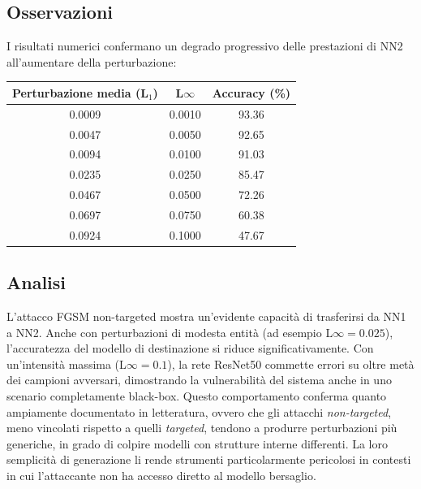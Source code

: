         \subsection{Osservazioni}
            I risultati numerici confermano un degrado progressivo delle prestazioni di NN2 all’aumentare della perturbazione:
                \begin{center}
                    \begin{tabular}{ccc}
                        \toprule
                        \textbf{Perturbazione media (L$_1$)} & \textbf{L$\infty$} & \textbf{Accuracy (\%)} \\
                        \midrule
                        0.0009 & 0.0010 & 93.36 \\
                        0.0047 & 0.0050 & 92.65 \\
                        0.0094 & 0.0100 & 91.03 \\
                        0.0235 & 0.0250 & 85.47 \\
                        0.0467 & 0.0500 & 72.26 \\
                        0.0697 & 0.0750 & 60.38 \\
                        0.0924 & 0.1000 & 47.67 \\
                        \bottomrule
                    \end{tabular}
                \end{center}

        \subsection{Analisi}
            L'attacco FGSM non-targeted mostra un'evidente capacità di trasferirsi da NN1 a NN2. Anche con perturbazioni di modesta entità (ad esempio L$\infty=0.025$), l'accuratezza del modello di destinazione si riduce significativamente. Con un'intensità massima (L$\infty=0.1$), la rete ResNet50 commette errori su oltre metà dei campioni avversari, dimostrando la vulnerabilità del sistema anche in uno scenario completamente black-box.
            Questo comportamento conferma quanto ampiamente documentato in letteratura, ovvero che gli attacchi \textit{non-targeted}, meno vincolati rispetto a quelli \textit{targeted}, tendono a produrre perturbazioni più generiche, in grado di colpire modelli con strutture interne differenti. La loro semplicità di generazione li rende strumenti particolarmente pericolosi in contesti in cui l’attaccante non ha accesso diretto al modello bersaglio.

